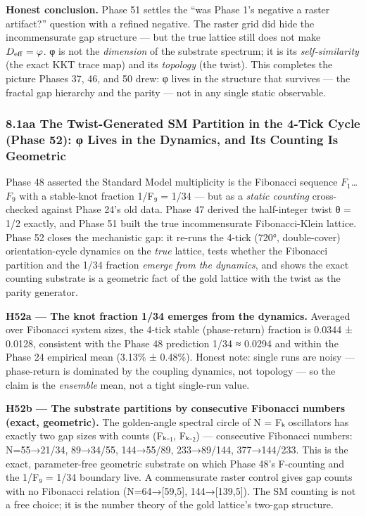 \documentclass[
]{article}
\begin{document}
\textbf{Honest conclusion.} Phase 51 settles the ``was Phase 1's
negative a raster artifact?'' question with a refined negative. The
raster grid did hide the incommensurate gap structure --- but the true
lattice still does not make \(D_{\rm eff}=\varphi\). φ is not the
\emph{dimension} of the substrate spectrum; it is its
\emph{self-similarity} (the exact KKT trace map) and its \emph{topology}
(the twist). This completes the picture Phases 37, 46, and 50 drew: φ
lives in the structure that survives --- the fractal gap hierarchy and
the parity --- not in any single static observable.

\subsubsection{8.1aa The Twist-Generated SM Partition in the 4-Tick
Cycle (Phase 52): φ Lives in the Dynamics, and Its Counting Is
Geometric}\label{aa-the-twist-generated-sm-partition-in-the-4-tick-cycle-phase-52-ux3c6-lives-in-the-dynamics-and-its-counting-is-geometric}

Phase 48 asserted the Standard Model multiplicity is the Fibonacci
sequence \(F_1\)\ldots{}\(F_9\) with a stable-knot fraction 1/F₉ = 1/34
--- but as a \emph{static counting} cross-checked against Phase 24's old
data. Phase 47 derived the half-integer twist θ = 1/2 exactly, and Phase
51 built the true incommensurate Fibonacci-Klein lattice. Phase 52
closes the mechanistic gap: it re-runs the 4-tick (720°, double-cover)
orientation-cycle dynamics on the \emph{true} lattice, tests whether the
Fibonacci partition and the 1/34 fraction \emph{emerge from the
dynamics}, and shows the exact counting substrate is a geometric fact of
the gold lattice with the twist as the parity generator.

\textbf{H52a --- The knot fraction 1/34 emerges from the dynamics.}
Averaged over Fibonacci system sizes, the 4-tick stable (phase-return)
fraction is 0.0344 ± 0.0128, consistent with the Phase 48 prediction
1/34 ≈ 0.0294 and within the Phase 24 empirical mean (3.13\% ± 0.48\%).
Honest note: single runs are noisy --- phase-return is dominated by the
coupling dynamics, not topology --- so the claim is the \emph{ensemble}
mean, not a tight single-run value.

\textbf{H52b --- The substrate partitions by consecutive Fibonacci
numbers (exact, geometric).} The golden-angle spectral circle of N = Fₖ
oscillators has exactly two gap sizes with counts (Fₖ₋₁, Fₖ₋₂) ---
consecutive Fibonacci numbers: N=55→21/34, 89→34/55, 144→55/89,
233→89/144, 377→144/233. This is the exact, parameter-free geometric
substrate on which Phase 48's F-counting and the 1/F₉ = 1/34 boundary
live. A commensurate raster control gives gap counts with no Fibonacci
relation (N=64→{[}59,5{]}, 144→{[}139,5{]}). The SM counting is not a
free choice; it is the number theory of the gold lattice's two-gap
structure.
\end{document}
